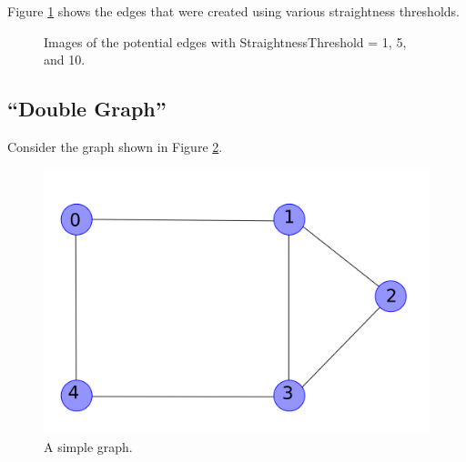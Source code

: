 \documentclass{InsightArticle}
\begin{document}
\begin{enumerate}
Figure \ref{fig:PotentialEdges} shows the edges that were created using various straightness thresholds.
\begin{figure}[H]
\centering
{}
\caption{Images of the potential edges with StraightnessThreshold = 1, 5, and 10.}
\label{fig:PotentialEdges}
\end{figure}

\subsection{``Double Graph''}
\label{sec:Algorithm:DoubleLoopEdges}
Consider the graph shown in Figure \ref{fig:TwoLoops1}.

\begin{figure}[H]
  \centering
  \includegraphics[width=0.3\linewidth]{images/TwoLoops1}
  \caption{A simple graph.}
  \label{fig:TwoLoops1}
\end{figure}


\end{enumerate}
\end{document}

